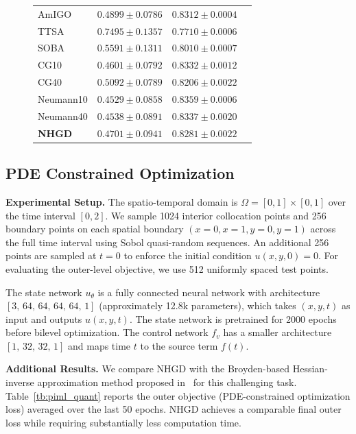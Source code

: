 \documentclass[11 pt]{article}
\begin{document}
\begin{figure}[h]
\begin{minipage}[h]{0.48\linewidth}
\begin{tabular}{lccc}
AmIGO       
& $0.4899 \pm 0.0786$ 
& $0.8312 \pm 0.0004$ \\

TTSA        
& $0.7495 \pm 0.1357$ 
& $0.7710 \pm 0.0006$ \\

SOBA        
& $0.5591 \pm 0.1311$ 
& $0.8010 \pm 0.0007$ \\

CG10        
& $0.4601 \pm 0.0792$ 
& $0.8332 \pm 0.0012$ \\

CG40        
& $0.5092 \pm 0.0789$ 
& $0.8206 \pm 0.0022$ \\

Neumann10  
& $0.4529 \pm 0.0858$ 
& $0.8359 \pm 0.0006$ \\

Neumann40  
& $0.4538 \pm 0.0891$ 
& $0.8337 \pm 0.0020$ \\

\textbf{NHGD}        
& $0.4701 \pm 0.0941$ 
& $0.8281 \pm 0.0022$ \\
\bottomrule
\end{tabular}
\end{minipage}
\end{figure}




\subsection{PDE Constrained Optimization}\label{app:experiments_piml}
\textbf{Experimental Setup.}   
The spatio-temporal domain is $\Omega = [0,1]\times[0,1]$ over the time interval $[0,2]$.
We sample 1024 interior collocation points and 256 boundary points on each spatial boundary
$(x=0, x=1, y=0, y=1)$ across the full time interval using Sobol quasi-random sequences.
An additional 256 points are sampled at $t=0$ to enforce the initial condition $u(x,y,0)=0$.
For evaluating the outer-level objective, we use 512 uniformly spaced test points.

The state network $u_\theta$ is a fully connected neural network with architecture
$[3,\,64,\,64,\,64,\,64,\,1]$ (approximately 12.8k parameters), which takes $(x,y,t)$ as input and outputs $u(x,y,t)$.
The state network is pretrained for 2000 epochs before bilevel optimization.
The control network $f_v$ has a smaller architecture $[1,\,32,\,32,\,1]$ and maps time $t$ to the source term $f(t)$.

\textbf{Additional Results.} We compare \textsc{NHGD} with the Broyden-based Hessian-inverse approximation method proposed in~\cite{hao2023bi} for this challenging task. 
Table~\ref{tb:piml_quant} reports the outer objective (PDE-constrained optimization loss) averaged over the last 50 epochs. 
\textsc{NHGD} achieves a comparable final outer loss while requiring substantially less computation time.
\end{document}
